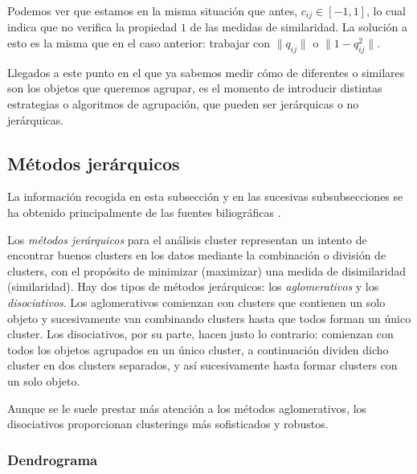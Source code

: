 \begin{observacion}
    Podemos ver que estamos en la misma situación que antes, $c_{ij} \in [-1,1]$, lo cual indica que no verifica la propiedad $1$ de las medidas de similaridad. La solución a esto es 
    la misma que en el caso anterior: trabajar con $\|q_{ij}\|$ o $\|1-q_{ij}^{2}\|$. \newline
\end{observacion}

Llegados a este punto en el que ya sabemos medir cómo de diferentes o similares son los objetos que queremos agrupar, es el momento de 
introducir distintas estrategias o algoritmos de agrupación, que pueden ser jerárquicas o no jerárquicas. 


\subsection{Métodos jerárquicos}  %

La información recogida en esta subsección y en las sucesivas subsubsecciones se ha obtenido principalmente de las fuentes biliográficas \cite{Bib-1, Bib-5, bejar-AC, Bib-2, gallardo, bejar-AC-2}. \newline

Los \textit{métodos jerárquicos} para el análisis cluster representan un intento de encontrar buenos clusters en los datos mediante la combinación o división de clusters, con el propósito de
minimizar (maximizar) una medida de disimilaridad (similaridad). Hay dos tipos de métodos jerárquicos: los \textit{aglomerativos} y los \textit{disociativos}. Los aglomerativos comienzan 
con clusters que contienen un solo objeto y sucesivamente van combinando clusters hasta que todos forman un único cluster. Los disociativos, por su parte, hacen justo lo contrario: 
comienzan con todos los objetos agrupados en un único cluster, a continuación dividen dicho cluster en dos clusters separados, y así sucesivamente hasta formar clusters con un solo objeto. 

\begin{observacion}
Aunque se le suele prestar más atención a los métodos aglomerativos, los disociativos proporcionan clusterings más sofisticados y robustos.
\end{observacion}

\subsubsection{Dendrograma}

